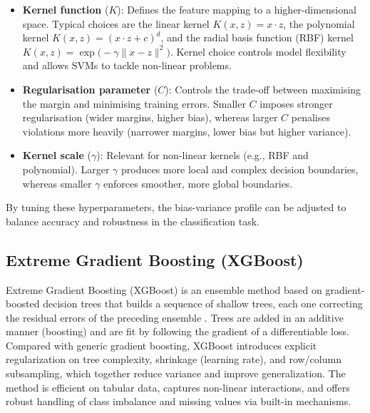 \begin{itemize}
    \item \textbf{Kernel function} ($K$): Defines the feature mapping to a higher-dimensional space. Typical choices are the linear kernel $K(x,z)=x \cdot z$, the polynomial kernel $K(x,z)=(x \cdot z + c)^d$, and the radial basis function (RBF) kernel $K(x,z)=\exp\!\big(-\gamma \lVert x-z\rVert^2\big)$. Kernel choice controls model flexibility and allows SVMs to tackle non-linear problems.
    \item \textbf{Regularisation parameter} ($C$): Controls the trade-off between maximising the margin and minimising training errors. Smaller $C$ imposes stronger regularisation (wider margins, higher bias), whereas larger $C$ penalises violations more heavily (narrower margins, lower bias but higher variance). 
    \item \textbf{Kernel scale} ($\gamma$): Relevant for non-linear kernels (e.g., RBF and polynomial). Larger $\gamma$ produces more local and complex decision boundaries, whereas smaller $\gamma$ enforces smoother, more global boundaries.
\end{itemize}

By tuning these hyperparameters, the bias-variance profile can be adjusted to balance accuracy and robustness in the classification task.


\subsection{Extreme Gradient Boosting (XGBoost)}\label{subsec:method-xgboost}
Extreme Gradient Boosting (XGBoost) is an ensemble method based on gradient-boosted decision trees that builds a sequence of shallow trees, each one correcting the residual errors of the preceding ensemble \citep{Chen2016XGBoost}. Trees are added in an additive manner (boosting) and are fit by following the gradient of a differentiable loss. Compared with generic gradient boosting, XGBoost introduces explicit regularization on tree complexity, shrinkage (learning rate), and row/column subsampling, which together reduce variance and improve generalization. The method is efficient on tabular data, captures non-linear interactions, and offers robust handling of class imbalance and missing values via built-in mechanisms.

